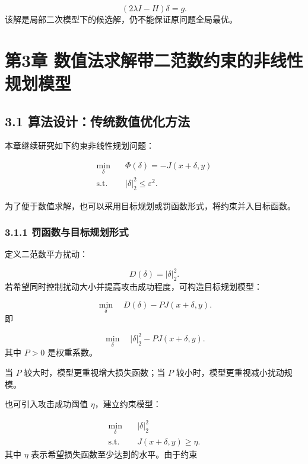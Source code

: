 ﻿\documentclass[UTF8,zihao=-4,fontset=none]{ctexart}
\begin{document}
\[
(2\lambda I-H)\delta=g.
\]
\noindent 该解是局部二次模型下的候选解，仍不能保证原问题全局最优。

\clearpage
\section*{第3章 数值法求解带二范数约束的非线性规划模型}
{}

\subsection*{3.1 算法设计：传统数值优化方法}
{}

本章继续研究如下约束非线性规划问题：

\[
\begin{aligned}
\min_{\delta}
\quad
&
\Phi(\delta)
=
-J(x+\delta,y)\\
\mathrm{s.t.}
\quad
&
|\delta|_2^2\le \varepsilon^2.
\end{aligned}
\]

为了便于数值求解，也可以采用目标规划或罚函数形式，将约束并入目标函数。

\subsubsection*{3.1.1 罚函数与目标规划形式}
{}

定义二范数平方扰动：

\[
D(\delta)=|\delta|_2^2.
\]
\noindent 若希望同时控制扰动大小并提高攻击成功程度，可构造目标规划模型：

\[
\min_{\delta}
\quad
D(\delta)-P J(x+\delta,y).
\]
\noindent 即

\[
\min_{\delta}
\quad
|\delta|_2^2-PJ(x+\delta,y).
\]
\noindent 其中 \(P>0\) 是权重系数。

当 \(P\) 较大时，模型更重视增大损失函数；当 \(P\) 较小时，模型更重视减小扰动规模。

也可引入攻击成功阈值 \(\eta\)，建立约束模型：

\[
\begin{aligned}
\min_{\delta}
\quad
&
|\delta|_2^2\\
\mathrm{s.t.}
\quad
&
J(x+\delta,y)\ge \eta.
\end{aligned}
\]
\noindent 其中 \(\eta\) 表示希望损失函数至少达到的水平。由于约束
\end{document}
